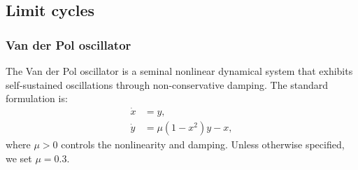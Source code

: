 \documentclass{article}
\theoremstyle{definition} \newtheorem{definition}{Definition}  \newtheorem{example}{Example}
\theoremstyle{remark} \newtheorem{remark}{Remark}
\newcounter{ct}
\begin{document}
\subsection{Limit cycles}


\subsubsection{Van der Pol oscillator}
The Van der Pol oscillator is a seminal nonlinear dynamical system that exhibits self-sustained oscillations through non-conservative damping\citep{vanderpol1926relaxation}.
The standard formulation is:
\begin{equation}
\begin{aligned}
\dot{x} &= y, \\
\dot{y} &= \mu (1 - x^2) y - x,
\end{aligned}
\end{equation}
where $\mu > 0$ controls the nonlinearity and damping. 
Unless otherwise specified, we set $\mu=0.3$.

\end{document}
